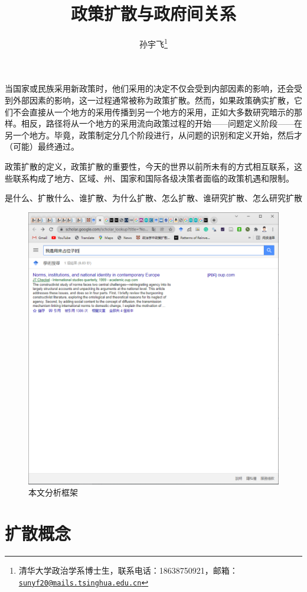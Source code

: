 \documentclass[
  12pt,
]{ctexart}
\title{政策扩散与政府间关系}
\author{孙宇飞\footnote{清华大学政治学系博士生，联系电话：18638750921，邮箱：\href{mailto:sunyf20@mails.tsinghua.edu.cn}{\nolinkurl{sunyf20@mails.tsinghua.edu.cn}}}}
\date{}
\begin{document}
\maketitle

当国家或民族采用新政策时，他们采用的决定不仅会受到内部因素的影响，还会受到外部因素的影响，这一过程通常被称为政策扩散。然而，如果政策确实扩散，它们不会直接从一个地方的采用传播到另一个地方的采用，正如大多数研究暗示的那样。相反，路径将从一个地方的采用流向政策过程的开始------问题定义阶段------在另一个地方。毕竟，政策制定分几个阶段进行，从问题的识别和定义开始，然后才（可能）最终通过。

政策扩散的定义，政策扩散的重要性，今天的世界以前所未有的方式相互联系，这些联系构成了地方、区域、州、国家和国际各级决策者面临的政策机遇和限制。

是什么、扩散什么、谁扩散、为什么扩散、怎么扩散、谁研究扩散、怎么研究扩散

\begin{figure}
\includegraphics[width=1\linewidth]{../figures/分析框架} \caption{本文分析框架}\label{fig:unnamed-chunk-1}
\end{figure}

\hypertarget{ux6269ux6563ux6982ux5ff5}{%
\section{扩散概念}\label{ux6269ux6563ux6982ux5ff5}}
\end{document}
